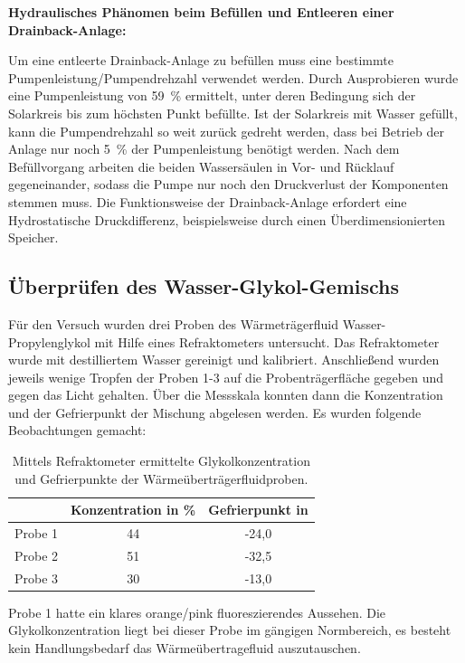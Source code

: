 \textbf{Hydraulisches Phänomen beim Befüllen und Entleeren einer Drainback-Anlage:}

Um eine entleerte Drainback-Anlage zu befüllen muss eine bestimmte Pumpenleistung/Pumpendrehzahl verwendet werden. Durch Ausprobieren wurde eine Pumpenleistung von \SI{59}{\percent} ermittelt, unter deren Bedingung sich der Solarkreis bis zum höchsten Punkt befüllte. Ist der Solarkreis mit Wasser gefüllt, kann die Pumpendrehzahl so weit zurück gedreht werden, dass bei Betrieb der Anlage nur noch \SI{5}{\percent} der Pumpenleistung benötigt werden. Nach dem Befüllvorgang arbeiten die beiden Wassersäulen in Vor- und Rücklauf gegeneinander, sodass die Pumpe nur noch den Druckverlust der Komponenten stemmen muss. Die Funktionsweise der Drainback-Anlage erfordert eine Hydrostatische Druckdifferenz, beispielsweise durch einen Überdimensionierten Speicher. 

\subsection{Überprüfen des Wasser-Glykol-Gemischs}

Für den Versuch wurden drei Proben des Wärmeträgerfluid Wasser-Propylenglykol mit Hilfe eines Refraktometers untersucht. Das Refraktometer wurde mit destilliertem Wasser gereinigt und kalibriert. Anschließend wurden jeweils wenige Tropfen der Proben 1-3 auf die Probenträgerfläche gegeben und gegen das Licht gehalten. Über die Messskala konnten dann die Konzentration und der Gefrierpunkt der Mischung abgelesen werden. Es wurden folgende Beobachtungen gemacht:

\begin{table}[H]
	\caption{Mittels Refraktometer ermittelte Glykolkonzentration und Gefrierpunkte der Wärmeüberträgerfluidproben.}
	\centering
	\begin{tabular}{lcc}
		\toprule
		& Konzentration in \si{\percent}  & Gefrierpunkt in \textcelsius\\
		\midrule
		Probe 1 &       44               &          -24,0           \\
		Probe 2 &       51            &            -32,5     \\
		Probe 3 &           30           &          -13,0       \\    
		\bottomrule  
	\end{tabular}
\end{table}

Probe 1 hatte ein klares orange/pink fluoreszierendes Aussehen. Die Glykolkonzentration liegt bei dieser Probe im gängigen Normbereich, es besteht kein Handlungsbedarf das Wärmeübertragefluid auszutauschen. 

